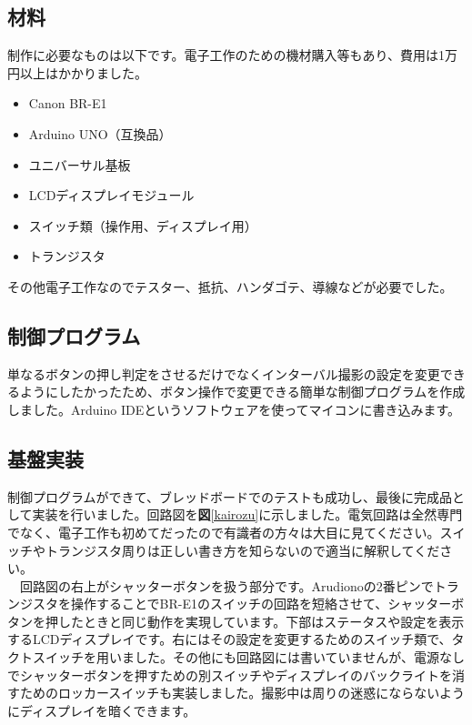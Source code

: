 \documentclass[../main]{subfiles}
\begin{document}
\subsection{材料}
制作に必要なものは以下です。電子工作のための機材購入等もあり、費用は1万円以上はかかりました。
\begin{itemize}
\item Canon BR-E1
\item Arduino UNO（互換品）
\item ユニバーサル基板
\item LCDディスプレイモジュール
\item スイッチ類（操作用、ディスプレイ用）
\item トランジスタ
\end{itemize}
その他電子工作なのでテスター、抵抗、ハンダゴテ、導線などが必要でした。

\subsection{制御プログラム}
単なるボタンの押し判定をさせるだけでなくインターバル撮影の設定を変更できるようにしたかったため、ボタン操作で変更できる簡単な制御プログラムを作成しました。Arduino IDEというソフトウェアを使ってマイコンに書き込みます。


\subsection{基盤実装}
制御プログラムができて、ブレッドボードでのテストも成功し、最後に完成品として実装を行いました。回路図を\textbf{図}\ref{kairozu}に示しました。電気回路は全然専門でなく、電子工作も初めてだったので有識者の方々は大目に見てください。スイッチやトランジスタ周りは正しい書き方を知らないので適当に解釈してください。\\
　回路図の右上がシャッターボタンを扱う部分です。Arudionoの2番ピンでトランジスタを操作することでBR-E1のスイッチの回路を短絡させて、シャッターボタンを押したときと同じ動作を実現しています。下部はステータスや設定を表示するLCDディスプレイです。右にはその設定を変更するためのスイッチ類で、タクトスイッチを用いました。その他にも回路図には書いていませんが、電源なしでシャッターボタンを押すための別スイッチやディスプレイのバックライトを消すためのロッカースイッチも実装しました。撮影中は周りの迷惑にならないようにディスプレイを暗くできます。
\end{document}
